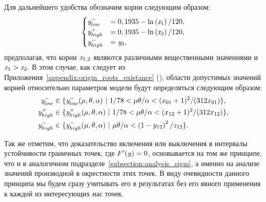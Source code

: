 Для дальнейшего удобства обозначим корни следующим образом:
\begin{equation}
    \begin{cases}
        \label{eq:origin_stability_bounds_y}
        \mathit{y}_{low}^{-}    &= 0,1935 - \ln\left( \mathit{x}_{1} \right) / 120, \\
        \mathit{y}_{high}^{+}   &= 0,1935 - \ln\left( \mathit{x}_{2} \right) / 120, \\
        \mathit{y}_{high}^{-}   &= \mathit{y}_{3}, \\
    \end{cases}
\end{equation}
предполагая, что корни $\mathit{x}_{1,2}$ являются различными вещественными значениями и $\mathit{x}_{1} > \mathit{x}_{2}$. В этом случае, как следует из Приложения~\ref{appendix:origin_roots_existance} (), области допустимых значений корней относительно параметров модели будут определяться следующим образом:
\begin{equation}
    \begin{aligned}
        \label{eq:origin_stability_bounds_params}
        \mathit{y}^{-}_{low}    &\in \{ \mathit{y}^{-}_{low}(\mu, \theta, \alpha)\ |\ 1 / 78 < \mu \theta / \alpha < (x_{01} + 1)^{2} / (312 x_{01}) \}, \\
        \mathit{y}^{+}_{high}   &\in \{ \mathit{y}^{+}_{high}(\mu, \theta, \alpha)\ |\ 1 / 78 < \mu \theta / \alpha < (x_{12} + 1)^{2} / (312 x_{12})  \}, \\
        \mathit{y}^{-}_{high}   &\in \{ \mathit{y}^{-}_{high}(\mu, \theta, \alpha)\ |\ \mu \theta / \alpha < \left(1 - y_{12}\right)^{2} / z_{12}  \}. \\
    \end{aligned}
\end{equation}

Так же отметим, что доказательство включения или выключения в интервалы устойчивости граничных точек, где $F^{\prime}(\mathit{y}) = 0$, основывается на том же принципе, что и в аналогичном подразделе~\autoref{subsection:analysis_sigm}, а именно на анализе значений производной в окрестности этих точек. В виду очевидности данного принципа мы будем сразу учитывать его в результатах без его явного применения к каждой из интересующих нас точек.

